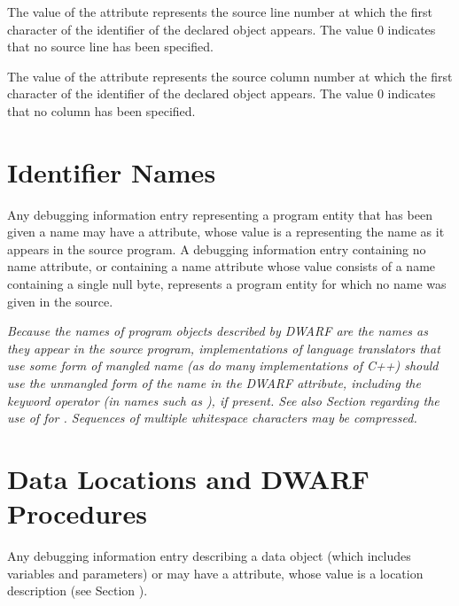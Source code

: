 The value of 
the \DWATdeclline{} attribute represents
the source line number at which the first character of
the identifier of the declared object appears. The value 0
indicates that no source line has been specified.

The value of 
the \DWATdeclcolumn{} attribute represents
the source column number at which the first character of
the identifier of the declared object appears. The value 0
indicates that no column has been specified.

\section{Identifier Names}
\label{chap:identifiernames}
Any 
\hypertarget{chap:DWATnamenameofdeclaration}{}
debugging information entry 
representing 
a program entity
that has been given a name may have a 
\DWATname{} attribute,
whose 
value is a  
representing the name as it appears in
the source program. A debugging information entry containing
no name attribute, or containing a name attribute whose value
consists of a name containing a single null byte, represents
a program entity for which no name was given in the source.

\textit{Because the names of program objects described by DWARF are the
names as they appear in the source program, implementations
of language translators that use some form of mangled name
(as do many implementations of C++) should use the unmangled
form of the name in the 
DWARF \DWATname{} attribute,
including the keyword operator (in names such as ),
if present. See also 
Section  regarding the use
of \DWATlinkagename{} for 
.
Sequences of
multiple whitespace characters may be compressed.}

\section{Data Locations and DWARF Procedures}
Any debugging information entry describing a data object (which
\hypertarget{chap:DWATlocationdataobjectlocation}{}
includes variables and parameters) or 
may have 
a
\DWATlocation{} attribute,
whose value is a location description
(see Section ).

